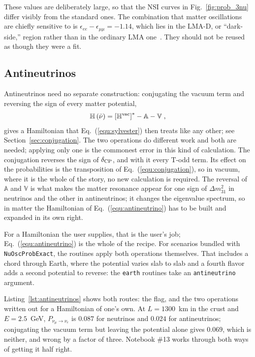 \documentclass[final,5p,times,twocolumn,sort,compress]{elsarticle}
\newcommand{\eq}{Eq.}
\newcommand{\fig}{Fig.}
\newcommand{\equ}[1]{\eq~(\ref{equ:#1})}
\newcommand{\figu}[1]{\fig~\ref{fig:#1}}
\begin{document}
These values are deliberately large, so that the NSI curves in \figu{prob_3nu} differ visibly from the standard ones.  The combination that matter oscillations are chiefly sensitive to is $\epsilon_{ee} - \epsilon_{\mu\mu} = -1.14$, which lies in the LMA-D, or ``dark-side,'' region rather than in the ordinary LMA one\ \cite{Esteban:2018ppq}.  They should not be reused as though they were a fit.


\subsection{Antineutrinos}

Antineutrinos need no separate construction: conjugating the vacuum term and reversing the sign of every matter potential,
\begin{equation}
 \label{equ:antineutrino}
 \mathbb{H}\left(\bar{\nu}\right)
 =
 \left[\mathbb{H}^{\rm vac}\right]^\ast - \mathbb{A} - \mathbb{V} \;,
\end{equation}
gives a Hamiltonian that \equ{sylvester} then treats like any other; see Section~\ref{sec:conjugation}.  The two operations do different work and both are needed; applying only one is the commonest error in this kind of calculation.  The conjugation reverses the sign of $\delta_{\rm CP}$, and with it every T-odd term.  Its effect on the probabilities is the transposition of \equ{conjugation}, so in vacuum, where it is the whole of the story, no new calculation is required.  The reversal of $\mathbb{A}$ and $\mathbb{V}$ is what makes the matter resonance appear for one sign of $\Delta m_{31}^2$ in neutrinos and the other in antineutrinos; it changes the eigenvalue spectrum, so in matter the Hamiltonian of \equ{antineutrino} has to be built and expanded in its own right.  

For a Hamiltonian the user supplies, that is the user's job; \equ{antineutrino} is the whole of the recipe.  For scenarios bundled with {\tt NuOscProbExact}, the routines apply both operations themselves.  That includes a chord through Earth, where the potential varies slab to slab and a fourth flavor adds a second potential to reverse: the {\tt earth} routines take an {\tt antineutrino} argument.

Listing\ \ref{lst:antineutrinos} shows both routes: the flag, and the two operations written out for a Hamiltonian of one's own.  At $L = 1300$~km in the crust and $E = 2.5$~GeV, $P_{\nu_\mu \to \nu_e}$ is $0.087$ for neutrinos and $0.024$ for antineutrinos; conjugating the vacuum term but leaving the potential alone gives $0.069$, which is neither, and wrong by a factor of three.  Notebook \#13 works through both ways of getting it half right.
\end{document}
